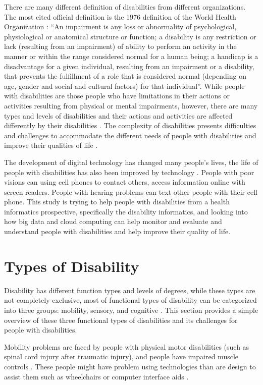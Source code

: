 \documentclass[sigconf]{acmart}
\begin{document}
There are many different definition of disabilities from different organizations. The most cited official
definition is the 1976 definition of the World Health Organization \cite{Appleyard2005}: ``An impairment is
any loss or abnormality of psychological, physiological or anatomical structure or function; a disability
is any restriction or lack (resulting from an impairment) of ability to perform an activity in the manner
or within the range considered normal for a human being; a handicap is a disadvantage for a given
individual, resulting from an impairment or a disability, that prevents the fulfillment of a role that is
considered normal (depending on age, gender and social and cultural factors) for that individual''. While
people with disabilities are those people who have limitations in their actions or activities resulting
from physical or mental impairments, however, there are many types and levels of disabilities and their
actions and activities are affected differently by their disabilities \cite{Appleyard2005}. The complexity
of disabilities presents difficulties and challenges to accommodate the different needs of people with
disabilities and improve their qualities of life \cite{Datapop}. 


The development of digital technology has changed many people's lives, the life of people with disabilities
has also been improved by technology \cite{Datapop}. People with poor visions can using cell phones to
contact others, access information online with screen readers. People with hearing problems can text other
people with their cell phone. This study is trying to help people with disabilities from a health
informatics prospective, specifically the disability informatics, and looking into how big data and cloud
computing can help monitor and evaluate and understand people with disabilities and help improve their
quality of life. 


\section{Types of Disability}
Disability has different function types and levels of degrees, while these types are not completely exclusive, most of functional types of disability can be categorized into three groups: mobility, sensory, and cognitive \cite{Appleyard2005}. This section provides a simple overview of these three functional types of disabilities and its challenges for people with disabilities. 

Mobility problems are faced by people with physical motor disabilities (such as spinal cord injury after traumatic injury), and people have impaired muscle controls \cite{SMITH1987376}. These people might have problem using technologies than are design to assist them such as wheelchairs or computer interface aids \cite{Appleyard2005}.
\end{document}
